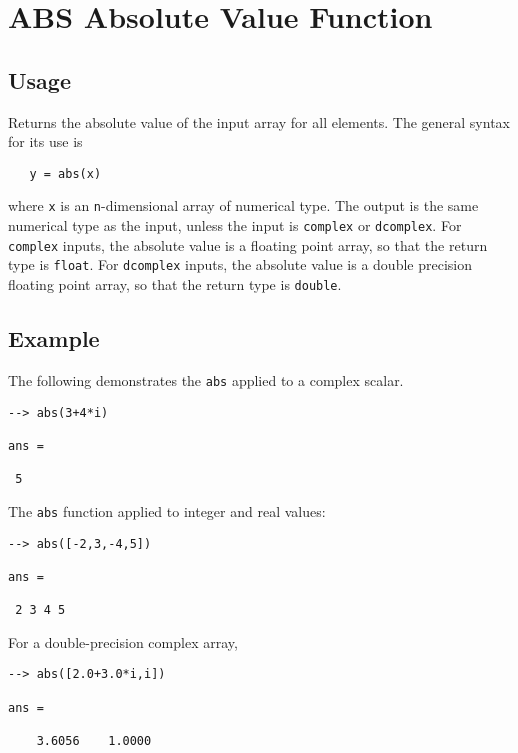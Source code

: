 \section{ABS Absolute Value Function}

\subsection{Usage}

Returns the absolute value of the input array for all elements.  The 
general syntax for its use is
\begin{verbatim}
   y = abs(x)
\end{verbatim}
where \verb|x| is an \verb|n|-dimensional array of numerical type.  The output 
is the same numerical type as the input, unless the input is \verb|complex|
or \verb|dcomplex|.  For \verb|complex| inputs, the absolute value is a floating
point array, so that the return type is \verb|float|.  For \verb|dcomplex|
inputs, the absolute value is a double precision floating point array, so that
the return type is \verb|double|.
\subsection{Example}

The following demonstrates the \verb|abs| applied to a complex scalar.
\begin{verbatim}
--> abs(3+4*i)

ans = 

 5 
\end{verbatim}
The \verb|abs| function applied to integer and real values:
\begin{verbatim}
--> abs([-2,3,-4,5])

ans = 

 2 3 4 5 
\end{verbatim}
For a double-precision complex array,
\begin{verbatim}
--> abs([2.0+3.0*i,i])

ans = 

    3.6056    1.0000 
\end{verbatim}
